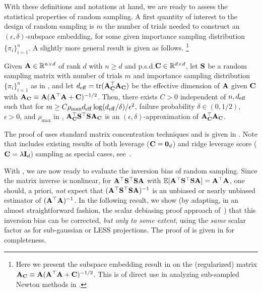 \documentclass[11pt,a4paper]{article}
\begin{document}
With these definitions and notations at hand, we are ready to assess the statistical properties of random sampling.
A first quantity of interest to the design of random sampling is $m$ the number of trials needed to construct an $(\epsilon,\delta)$-subspace embedding, for some given importance sampling distribution $\{ \pi_i \}_{i=1}^n$.
A slightly more general result is given as follows.%
\footnote{Here we present the subspace embedding result in  on the (regularized) matrix $\A_\C \equiv \A(\A^\top \A+\C)^{-1/2}$. This is of direct use in analyzing sub-sampled Newton methods in .}

\begin{lemma} \label{lem:sub_embed}
Given $\A\in \RR^{n\times d}$ of rank $d$ with $n\geq d$ and p.s.d.\@ $\C\in\RR^{d\times d}$,
let $\S$ be a random sampling matrix with number of trials $m$ and importance sampling distribution $\{ \pi_i \}_{i=1}^n$ as in , and let $d_{\eff}=\tr( \A_\C^\top \A_\C )$ be the effective dimension of $\A$ given $\C$ with $\A_\C \equiv \A(\A^\top \A+\C)^{-1/2}$. 
Then, there exists $C > 0$ independent of $n,d_{\eff}$ such that for $m\geq C\rho_{\max} d_{\eff} \log(d_{\eff}/\delta )/\epsilon^2$, failure probability $ \delta \in (0,1/2)$, $\epsilon > 0$, and $\rho_{\max}$ in , $ \A_\C^\top\S^\top\S\A_\C$ is an $(\epsilon,\delta)$-approximation of $\A_\C^\top\A_\C$. 
\end{lemma}

The proof of  uses standard matrix concentration techniques and is given in .
Note that  includes existing results of both leverage ($\C = \zo_d$) and ridge leverage score ($\C = \lambda \I_d$) sampling as special cases, see~\citet[Theorm~3]{chowdhury2018iterative}.  

With , we are now ready to evaluate the inversion bias of random sampling.
Since the matrix inverse is nonlinear, for $\A^\top \S^\top\S \A$ with $\EE[\A^\top \S^\top\S \A] = \A^\top \A$, one should, a priori, \emph{not} expect that $(\A^\top \S^\top\S \A)^{-1}$ is an unbiased or nearly unbiased estimator of $(\A^\top \A)^{-1}$.
In the following result, we show (by adapting, in an almost straightforward fashion, the scalar debiasing proof approach of~\citet{derezinski2021newtonless,derezinski2021sparse}) that this inversion bias can be corrected, \emph{but only to some extent}, using the \emph{same} scalar factor as for sub-gaussian or LESS projections.
The proof of  is given in  for completeness.
\end{document}
